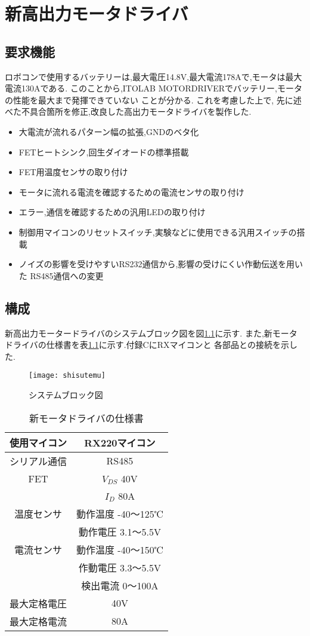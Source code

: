 \chapter{新高出力モータドライバ}

\section{要求機能}
ロボコンで使用するバッテリーは,最大電圧14.8V,最大電流178Aで,モータは最大電流130Aである.
このことから,ITOLAB MOTORDRIVERでバッテリー,モータの性能を最大まで発揮できていない
ことが分かる.
これを考慮した上で,
先に述べた不具合箇所を修正,改良した高出力モータドライバを製作した.
\begin{itemize}
\item 大電流が流れるパターン幅の拡張,GNDのベタ化
\item FETヒートシンク,回生ダイオードの標準搭載
\item FET用温度センサの取り付け
\item モータに流れる電流を確認するための電流センサの取り付け
\item エラー,通信を確認するための汎用LEDの取り付け
\item 制御用マイコンのリセットスイッチ,実験などに使用できる汎用スイッチの搭載
\item ノイズの影響を受けやすいRS232通信から,影響の受けにくい作動伝送を用いた
RS485通信への変更
\end{itemize}


\section{構成}
新高出力モータードライバのシステムブロック図を図\ref{fig:shisutemu}に示す.
また,新モータドライバの仕様書を表\ref{tab:shinshiyou}に示す.付録CにRXマイコンと
各部品との接続を示した.
\begin{figure}[H]
  \begin{center}
    \texttt{[image: shisutemu]}
    \end{center}
  \caption{システムブロック図}
 \label{fig:shisutemu}
\end{figure}
\begin{table}[htb]
\centering
\caption{新モータドライバの仕様書}
\begin{tabular}{|c|c|} \hline
使用マイコン&RX220マイコン\\ \hline
シリアル通信&RS485\\ \hline
FET&$V_{DS}$  40V\\
   &$I_D$  80A  \\ \hline
温度センサ&動作温度 -40～125℃ \\
&動作電圧 3.1～5.5V \\ \hline
電流センサ&動作温度 -40～150℃\\
&作動電圧 3.3～5.5V \\
&検出電流 0～100A \\ \hline
最大定格電圧&40V\\ \hline
最大定格電流&80A\\ \hline
\end{tabular}
\label{tab:shinshiyou}
\end{table}

